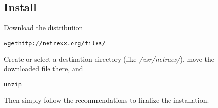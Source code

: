 \subsection{Install \nr{}}
Download the \nr{} distribution
\begin{alltt}
wget http://netrexx.org/files/\nrpackagename{}
\end{alltt}
Create or select a destination directory (like \emph{/usr/netrexx/}), move the downloaded file there, and
\begin{alltt}
unzip \nrpackagename{}
\end{alltt}
Then simply follow the \nr{} recommendations to finalize the installation.


